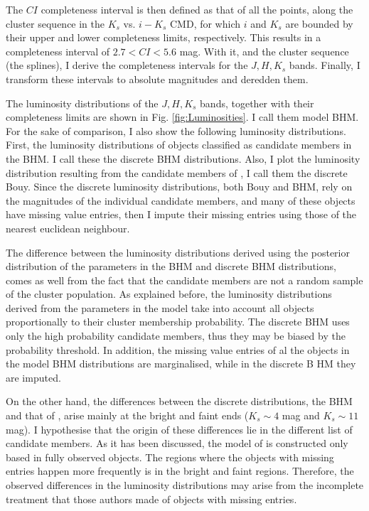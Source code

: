 The $CI$ completeness interval is then defined as that of all the points, along the cluster sequence in the $K_s$ vs. $i-K_s$ CMD, for which $i$ and $K_s$ are bounded by their upper and lower completeness limits, respectively. This results in a completeness interval of  $2.7<CI<5.6$ mag. With it, and the cluster sequence (the splines), I derive the completeness intervals for the $J,H,K_s$ bands. Finally, I transform these intervals to absolute magnitudes and deredden them. 

The luminosity distributions of the $J,H,K_s$ bands, together with their completeness limits are shown in Fig. \ref{fig:Luminosities}. I call them model BHM. For the sake of comparison, I also show the following luminosity distributions. First, the luminosity distributions of objects classified as candidate members in the BHM. I call these the discrete BHM distributions. Also, I plot the luminosity distribution resulting from the candidate members of \citet{Bouy2015}, I call them the discrete Bouy. Since the discrete luminosity distributions, both Bouy and BHM, rely on the magnitudes of the individual candidate members, and many of these objects have missing value entries, then I impute their missing entries using those of the nearest euclidean neighbour. 

The difference between the luminosity distributions derived using the posterior distribution of the parameters in the BHM and discrete BHM distributions, comes as well from the fact that the candidate members are not a random sample of the cluster population. As explained before, the luminosity distributions derived from the parameters in the model take into account all objects proportionally to their cluster membership probability. The discrete BHM uses only the high probability candidate members, thus they may be biased by the probability threshold. In addition, the missing value entries of al the objects in the model BHM distributions are marginalised, while in the discrete B
HM they are imputed.
 
On the other hand, the differences between the discrete distributions, the BHM and that of \citet{Bouy2015}, arise mainly at the bright and faint ends ($K_s\sim 4$ mag and $K_s\sim11$ mag). I hypothesise that the origin of these differences lie in the different list of candidate members. As it has been discussed, the model of \citet{Bouy2015} is constructed only based in fully observed objects. The regions where the objects with missing entries happen more frequently is in the bright and faint regions. Therefore, the observed differences in the luminosity distributions may arise from the incomplete treatment that those authors made of objects with missing entries.

